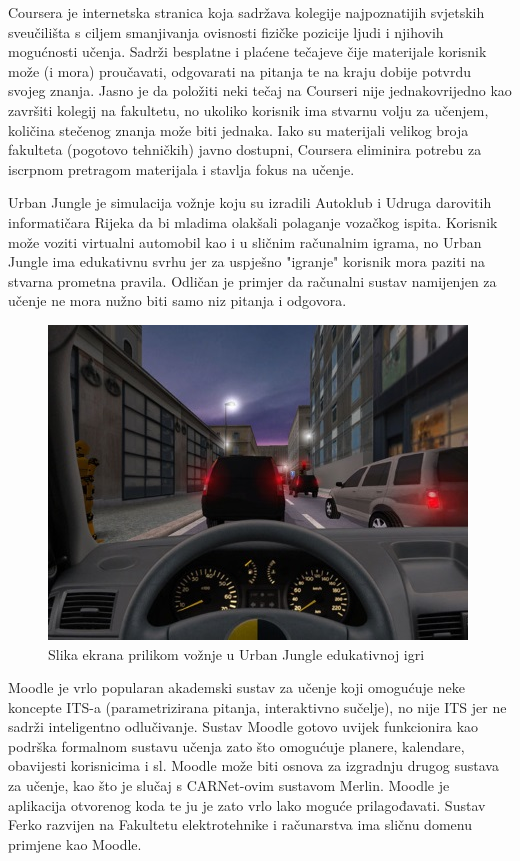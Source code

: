 \documentclass[times, utf8, zavrsni, numeric]{fer}
\begin{document}
\par
Coursera je internetska stranica koja sadržava kolegije najpoznatijih svjetskih sveučilišta s ciljem smanjivanja ovisnosti fizičke pozicije ljudi i njihovih mogućnosti učenja. Sadrži besplatne i plaćene tečajeve čije materijale korisnik može (i mora) proučavati, odgovarati na pitanja te na kraju dobije potvrdu svojeg znanja.\cite{coursera} Jasno je da položiti neki tečaj na Courseri nije jednakovrijedno kao završiti kolegij na fakultetu, no ukoliko korisnik ima stvarnu volju za učenjem, količina stečenog znanja može biti jednaka. Iako su materijali velikog broja fakulteta (pogotovo tehničkih) javno dostupni, Coursera eliminira potrebu za iscrpnom pretragom materijala i stavlja fokus na učenje.
\par
Urban Jungle je simulacija vožnje koju su izradili Autoklub i Udruga darovitih informatičara Rijeka da bi mladima olakšali polaganje vozačkog ispita.\cite{urbanjungle} Korisnik  može voziti virtualni automobil kao i u sličnim računalnim igrama, no Urban Jungle ima edukativnu svrhu jer za uspješno "igranje" korisnik mora paziti na stvarna prometna pravila. Odličan je primjer da računalni sustav namijenjen za učenje ne mora nužno biti samo niz pitanja i odgovora.

\begin{figure}[htb]
	\centering
	\includegraphics[]{img/urbjng.jpg}
	\caption{Slika ekrana prilikom vožnje u Urban Jungle edukativnoj igri\cite{urbanjungpic}}
	\label{fig:urbjng}
\end{figure}

\par
Moodle je vrlo popularan akademski sustav za učenje koji omogućuje neke koncepte ITS-a (parametrizirana pitanja, interaktivno sučelje), no nije ITS jer ne sadrži inteligentno odlučivanje.\cite{moodle} Sustav Moodle gotovo uvijek funkcionira kao podrška formalnom sustavu učenja zato što omogućuje planere, kalendare, obavijesti korisnicima i sl. Moodle može biti osnova za izgradnju drugog sustava za učenje, kao što je slučaj s CARNet-ovim sustavom Merlin. Moodle je aplikacija otvorenog koda te ju je zato vrlo lako moguće prilagođavati. Sustav Ferko razvijen na Fakultetu elektrotehnike i računarstva ima sličnu domenu primjene kao Moodle.
\end{document}
